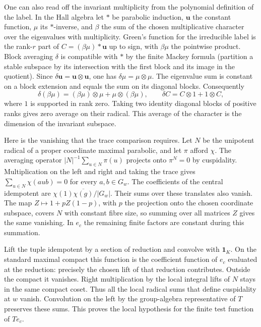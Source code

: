 One can also read off the invariant multiplicity from the polynomial
definition of the label. In the Hall algebra let $*$ be parabolic
induction, $\mathbf{u}$ the constant function, $\mu$ its $*$-inverse,
and $\beta$ the sum of the chosen multiplicative character over
the eigenvalues with multiplicity. Green's function for the irreducible
label is the rank-$r$ part of $C=(\beta\mu)*\mathbf{u}$ up to sign,
with $\beta\mu$ the pointwise product. Block averaging $\delta$ is
compatible with $*$ by the finite Mackey formula (partition a stable
subspace by its intersection with the first block and its image in the
quotient). Since $\delta\mathbf{u}=\mathbf{u}\otimes\mathbf{u}$,
one has $\delta\mu=\mu\otimes\mu$. The eigenvalue sum is constant on
a block extension and equals the sum on its diagonal blocks. Consequently
\[
 \delta(\beta\mu)=(\beta\mu)\otimes\mu+\mu\otimes(\beta\mu),
 \qquad \delta C=C\otimes 1+1\otimes C,
\]
where $1$ is supported in rank zero. Taking two identity diagonal
blocks of positive ranks gives zero average on their radical. This
average of the character is the dimension of the invariant subspace.

Here is the vanishing that the trace comparison requires. Let $N$ be
the unipotent radical of a proper coordinate maximal parabolic, and
let $\pi$ afford $\chi$. The averaging operator
$|N|^{-1}\sum_{u\in N}\pi(u)$ projects onto $\pi^N=0$ by cuspidality.
Multiplication on the left and right and taking the trace gives
$\sum_{u\in N}\chi(aub)=0$ for every $a,b\in G_w$. The coefficients of
the central idempotent are $\chi(1)\overline{\chi(g)}/|G_w|$.
Their sums over these translates also vanish. The map
$Z\mapsto 1+pZ(1-p)$, with $p$ the projection onto the chosen
coordinate subspace, covers $N$ with constant fibre size, so summing
over all matrices $Z$ gives the same vanishing. In $e_c$ the remaining
finite factors are constant during this summation.

Lift the tuple idempotent by a section of reduction and convolve with
$\mathbf 1_K$. On the standard maximal compact this function is the
coefficient function of $e_c$ evaluated at the reduction: precisely the
chosen lift of that reduction contributes. Outside the compact it
vanishes. Right multiplication by the local integral lifts of $N$ stays
in the same compact coset. Thus all the local radical sums that define
cuspidality at $w$ vanish. Convolution on the left by the group-algebra
representative of $T$ preserves these sums. This proves the local
hypothesis for the finite test function of $T e_c$.

